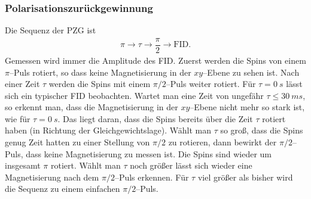 \documentclass[10pt]{article}
\begin{document}
\begin{multicols}{2}
\subsubsection{Polarisationszurückgewinnung}
Die Sequenz der PZG ist
\begin{align} 
        \pi \rightarrow \tau \rightarrow \dfrac{\pi }{2}\rightarrow \text{FID}
.\end{align} 
Gemessen wird immer die Amplitude des FID.
Zuerst werden die Spins von einem $\pi $--Puls rotiert, so dass keine Magnetisierung in der $xy$--Ebene zu sehen ist.
Nach einer Zeit $\tau $ werden die Spins mit einem $\pi /2$--Puls weiter rotiert.
Für $\tau =\SI{0}{s}$ lässt sich ein typischer FID beobachten.
Wartet man eine Zeit von ungefähr $\tau \leq \SI{30}{ms}$, so erkennt man, dass die Magnetisierung in der $xy$--Ebene nicht mehr so stark ist, wie für $\tau =\SI{0}{s}$.
Das liegt daran, dass die Spins bereits über die Zeit $\tau $ rotiert haben (in Richtung der Gleichgewichtslage).
Wählt man $\tau $ so groß, dass die Spins genug Zeit hatten zu einer Stellung von $\pi /2$ zu rotieren, dann bewirkt der $\pi /2$--Puls, dass keine Magnetisierung zu messen ist.
Die Spins sind wieder um insgesamt $\pi $ rotiert.
Wählt man $\tau $ noch größer lässt sich wieder eine Magnetisierung nach dem $\pi /2$--Puls erkennen.
Für $\tau $ viel größer als bisher wird die Sequenz zu einem einfachen $\pi /2$--Puls.


\end{multicols}
\end{document}

